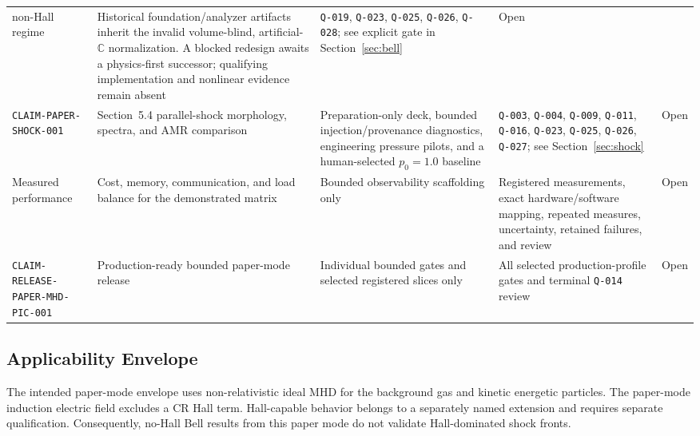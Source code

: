 \documentclass[twocolumn]{aastex701}
\newcommand{\claimid}[1]{\texttt{#1}}
\newcommand{\qgate}[1]{\texttt{#1}}
\begin{document}
\begin{table}[htbp]
\begin{tabular}{p{} p{} p{}
                p{} p{}}
non-Hall regime &
Historical foundation/analyzer artifacts inherit the invalid volume-blind,
artificial-$\mathbb{C}$ normalization. A blocked redesign awaits a
physics-first successor; qualifying implementation and nonlinear evidence
remain absent &
\qgate{Q-019}, \qgate{Q-023}, \qgate{Q-025}, \qgate{Q-026},
\qgate{Q-028}; see explicit gate in Section~\ref{sec:bell} &
Open \\
\claimid{CLAIM-PAPER-SHOCK-001} &
Section~5.4 parallel-shock morphology, spectra, and AMR comparison &
Preparation-only deck, bounded injection/provenance diagnostics, engineering
pressure pilots, and a human-selected $p_0=1.0$ baseline &
\qgate{Q-003}, \qgate{Q-004}, \qgate{Q-009}, \qgate{Q-011},
\qgate{Q-016}, \qgate{Q-023}, \qgate{Q-025}, \qgate{Q-026},
\qgate{Q-027}; see Section~\ref{sec:shock} &
Open \\
Measured performance &
Cost, memory, communication, and load balance for the demonstrated matrix &
Bounded observability scaffolding only &
Registered measurements, exact hardware/software mapping, repeated measures,
uncertainty, retained failures, and review &
Open \\
\claimid{CLAIM-RELEASE-PAPER-MHD-PIC-001} &
Production-ready bounded paper-mode release &
Individual bounded gates and selected registered slices only &
All selected production-profile gates and terminal \qgate{Q-014} review &
Open \\
\bottomrule
\end{tabular}
\end{table}

\subsection{Applicability Envelope}
\label{sec:applicability}

The intended paper-mode envelope uses non-relativistic ideal MHD for the
background gas and kinetic energetic particles. The paper-mode induction
electric field excludes a CR Hall term. Hall-capable behavior belongs to a
separately named extension and requires separate qualification. Consequently,
no-Hall Bell results from this paper mode do not validate Hall-dominated shock
fronts.
\end{document}
